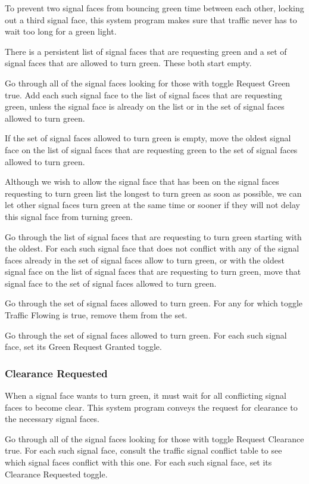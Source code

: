 \documentclass[letterpaper,twoside]{article}
\begin{document}
To prevent two signal faces from bouncing green time between each other,
locking out a third signal face, this system program makes sure that
traffic never has to wait too long for a green light.

There is a persistent list of signal faces that are requesting green
and a set of signal faces that are allowed to turn green.
These both start empty.

Go through all of the signal faces looking for those with toggle Request
Green true.  Add each such signal face to the list of
signal faces that are requesting green, unless the signal face is already on
the list or in the set of signal faces allowed to turn green.

If the set of signal faces allowed to turn green is empty, move the
oldest signal face on the list of signal faces that are requesting
green to the set of signal faces allowed to turn green.

Although we wish to allow the signal face that has been on the
signal faces requesting to turn green list the longest to turn green
as soon as possible, we can let other signal faces turn green
at the same time or sooner if they will not delay this signal face
from turning green.

Go through the list of signal faces that are requesting to turn green
starting with the oldest.  For each such signal face that does not
conflict with any of the signal faces already in the set of signal
faces allow to turn green, or with the oldest signal face on the list
of signal faces that are requesting to turn green, move that signal face
to the set of signal faces allowed to turn green.

Go through the set of signal faces allowed to turn green.  For any
for which toggle Traffic Flowing is true, remove them from the set.

Go through the set of signal faces allowed to turn green.  For each
such signal face, set its Green Request Granted toggle.

\subsubsection{Clearance Requested}

When a signal face wants to turn green, it must wait for all conflicting
signal faces to become clear.  This system program conveys the request
for clearance to the necessary signal faces.

Go through all of the signal faces looking for those with toggle
Request Clearance true.  For each such signal face, consult the traffic
signal conflict table to see which signal faces conflict with this one.
For each such signal face, set its Clearance Requested toggle.
\end{document}
